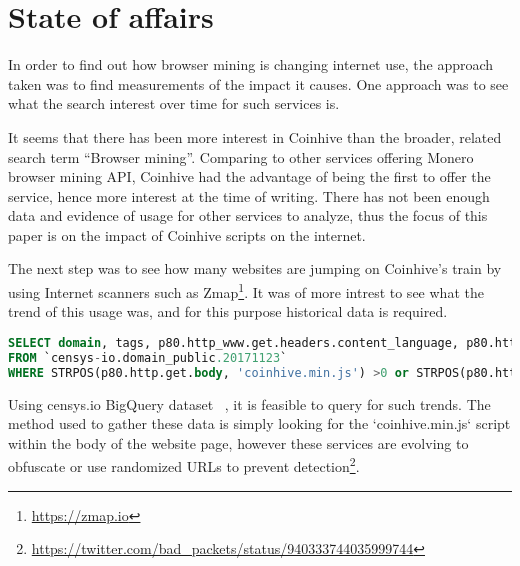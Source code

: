 \section{State of affairs}
In order to find out how browser mining is changing internet use, the approach taken was to find measurements of the impact it causes. One approach was to see what the search interest over time for such services is. 

\begin{center}
	\caption{Google Trend - Search interest over last 12 months}
\end{center}

It seems that there has been more interest in Coinhive than the broader, related search term ``Browser mining''. Comparing to other services offering Monero browser mining API, Coinhive had the advantage of being the first to offer the service, hence more interest at the time of writing. There has not been enough data and evidence of usage for other services to analyze, thus the focus of this paper is on the impact of Coinhive scripts on the internet. 

The next step was to see how many websites are jumping on Coinhive's train by using Internet scanners such as Zmap\footnote{\url{https://zmap.io}}. It was of more intrest to see what the trend of this usage was, and for this purpose historical data is required. 

\begin{lstlisting}[caption={BigQuery SQL query to find websites using coinhive miner script using censys.io datasets},label={lst:bigquery},language=sql]
SELECT domain, tags, p80.http_www.get.headers.content_language, p80.http_www.get.headers.server, p80.http.get.headers.x_powered_by, p80.http.get.title , p80.http_www.get.body as wwwbody, p80.http.get.body as plainbody
FROM `censys-io.domain_public.20171123`
WHERE STRPOS(p80.http.get.body, 'coinhive.min.js') >0 or STRPOS(p80.http_www.get.body, 'coinhive.min.js') >0)
\end{lstlisting}


Using censys.io BigQuery dataset ~\cite{censys15}, it is feasible to query for such trends. The method used to gather these data is simply looking for the `coinhive.min.js` script within the body of the website page, however these services are evolving to obfuscate or use randomized URLs to prevent detection\footnote{\url{https://twitter.com/bad_packets/status/940333744035999744}}.


